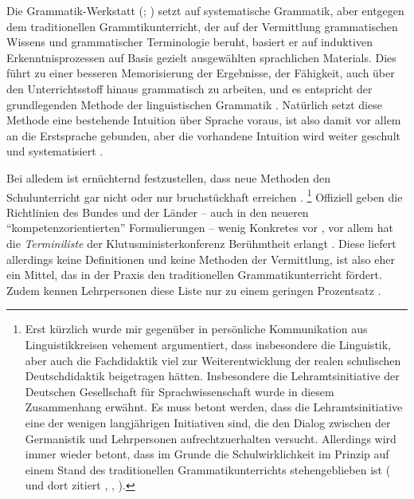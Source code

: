Die Grammatik-Werkstatt (\citealt{EisenbergMenzel1995}; \citealt[Abschnitt~3.2.4]{Bredel2013}) setzt auf systematische Grammatik, aber entgegen dem traditionellen Grammtikunterricht, der auf der Vermittlung grammatischen Wissens und grammatischer Terminologie beruht, basiert er auf induktiven Erkenntnisprozessen auf Basis gezielt ausgewählten sprachlichen Materials.
Dies führt zu einer besseren Memorisierung der Ergebnisse, der Fähigkeit, auch über den Unterrichtsstoff hinaus grammatisch zu arbeiten, und es entspricht der grundlegenden Methode der linguistischen Grammatik \citep[239]{Bredel2013}.
Natürlich setzt diese Methode eine bestehende Intuition über Sprache voraus, ist also damit vor allem an die Erstsprache gebunden, aber die vorhandene Intuition wird weiter geschult und systematisiert \citep[241]{Bredel203}.

Bei alledem ist ernüchternd festzustellen, dass neue Methoden den Schulunterricht gar nicht oder nur bruchstückhaft erreichen \citep[243]{Bredel2013}.%
\footnote{Erst kürzlich wurde mir gegenüber in persönliche Kommunikation aus Linguistikkreisen vehement argumentiert, dass insbesondere die Linguistik, aber auch die Fachdidaktik viel zur Weiterentwicklung der realen schulischen Deutschdidaktik beigetragen hätten.
Insbesondere die Lehramtsinitiative der Deutschen Gesellschaft für Sprachwissenschaft wurde in diesem Zusammenhang erwähnt.
Es muss betont werden, dass die Lehramtsinitiative eine der wenigen langjährigen Initiativen sind, die den Dialog zwischen der Germanistik und Lehrpersonen aufrechtzuerhalten versucht.
Allerdings wird immer wieder betont, dass im Grunde die Schulwirklichkeit im Prinzip auf einem Stand des traditionellen Grammatikunterrichts stehengeblieben ist (\zB \citealt[211]{Steets2003} und dort zitiert \citealt[143]{SteinigHuneke2002}, \citealt[243,257]{Bredel2013}, \citealt[2]{KoepckeZiegler2013}).}
Offiziell geben die Richtlinien des Bundes und der Länder -- auch in den neueren "`kompetenzorientierten"' Formulierungen -- wenig Konkretes vor \citep[250--255]{Bredel}, vor allem hat die \textit{Terminiliste} der Klutusministerkonferenz Berühmtheit erlangt \citep[244--249]{Bredel2013}.
Diese liefert allerdings keine Definitionen und keine Methoden der Vermittlung, ist also eher ein Mittel, das in der Praxis den traditionellen Grammatikunterricht fördert.
Zudem kennen Lehrpersonen diese Liste nur zu einem geringen Prozentsatz \citep{Haecker2009}.



